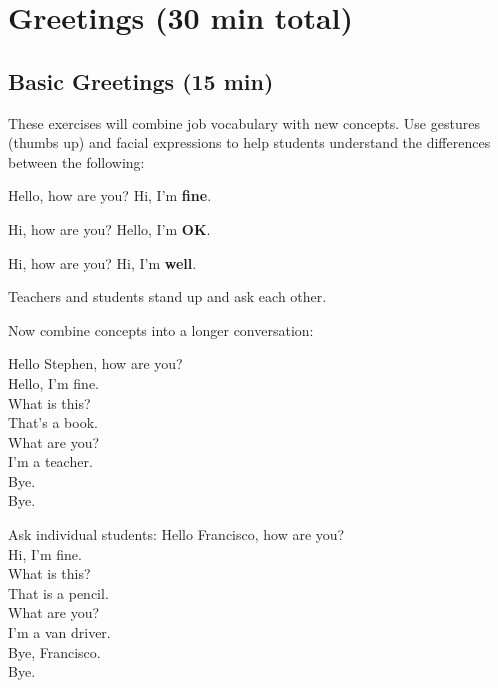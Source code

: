 \pagebreak
\section{Greetings (30 min total)}
\subsection{Basic Greetings (15 min)}
These exercises will combine job vocabulary with new concepts. Use gestures (thumbs up) and facial expressions to help students understand the differences between the following:
\begin{framed}
\dialt Hello, how are you? Hi, I'm \textbf{fine}.
\end{framed}
\begin{framed}
\dialt Hi, how are you? Hello, I'm \textbf{OK}.
\end{framed}
\begin{framed}
\dialt Hi, how are you? Hi, I'm \textbf{well}.
\end{framed}

Teachers and students stand up and ask each other.

Now combine concepts into a longer conversation:
\begin{framed}
\dialt Hello Stephen, how are you?\\
\hspace{0em}\phantom \dialt Hello, I'm fine.\\
\hspace{0em}\phantom \dialt What is this?\\
\hspace{0em}\phantom \dialt That's a book.\\
\hspace{0em}\phantom \dialt What are you?\\
\hspace{0em}\phantom \dialt I'm a teacher.\\
\hspace{0em}\phantom \dialt Bye.\\
\hspace{0em}\phantom \dialt Bye.
\end{framed}

Ask individual students:
\ex
\dialt Hello Francisco, how are you?\\
\dials Hi, I'm fine.\\
\dialt What is this?\\
\dials That is a pencil.\\
\dialt What are you?\\
\dials I'm a van driver.\\
\dialt Bye, Francisco.\\
\dials Bye.
\xe

